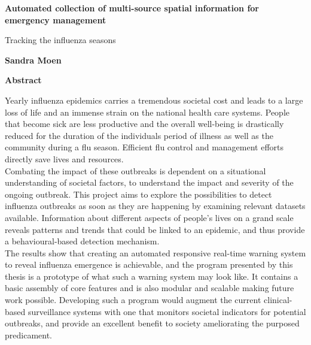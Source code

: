 \thispagestyle{plain}
\begin{center}
	\Large
	\textbf{Automated collection of multi-source spatial information for emergency management}
	
	\vspace{0.4cm}
	\large
	Tracking the influenza seasons
	
	\vspace{0.4cm}
	\textbf{Sandra Moen}
	
	\vspace{0.9cm}
	\textbf{Abstract}
\end{center}
Yearly influenza epidemics carries a tremendous societal cost and leads to a large loss of life and an immense strain on the national health care systems. People that become sick are less productive and the overall well-being is drastically reduced for the duration of the individuals period of illness as well as the community during a flu season. Efficient flu control and management efforts directly save lives and resources.\\

Combating the impact of these outbreaks is dependent on a situational understanding of societal factors, to understand the impact and severity of the ongoing outbreak. This project aims to explore the possibilities to detect influenza outbreaks as soon as they are happening by examining relevant datasets available. Information about different aspects of people's lives on a grand scale reveals patterns and trends that could be linked to an epidemic, and thus provide a behavioural-based detection mechanism.\\

The results show that creating an automated responsive real-time warning system to reveal influenza emergence is achievable, and the program presented by this thesis is a prototype of what such a warning system may look like. It contains a basic assembly of core features and is also modular and scalable making future work possible. Developing such a program would augment the current clinical-based surveillance systems with one that monitors societal indicators for potential outbreaks, and provide an excellent benefit to society ameliorating the purposed predicament.





